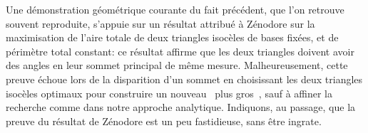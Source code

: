 \begin{remark}
	Une démonstration géométrique courante du fait précédent, que l'on retrouve souvent reproduite, s'appuie sur un résultat attribué à Zénodore sur la maximisation de l'aire totale de deux triangles isocèles de bases fixées, et de périmètre total constant:
	ce résultat affirme que les deux triangles doivent avoir des angles en leur sommet principal de même mesure.
	Malheureusement, cette preuve échoue lors de la disparition d'un sommet en choisissant les deux triangles isocèles optimaux pour construire un nouveau \ngone\ \og plus gros \fg\,, sauf à affiner la recherche comme dans notre approche analytique.
	Indiquons, au passage, que la preuve du résultat de Zénodore est un peu fastidieuse, sans être ingrate.
\end{remark}
	



%
%
%
%
%	


